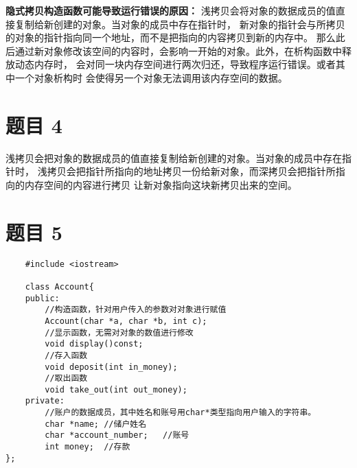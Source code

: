 \documentclass{article}
\begin{document}
\textbf{隐式拷贝构造函数可能导致运行错误的原因：}
浅拷贝会将对象的数据成员的值直接复制给新创建的对象。当对象的成员中存在指针时，
新对象的指针会与所拷贝的对象的指针指向同一个地址，而不是把指向的内容拷贝到新的内存中。
那么此后通过新对象修改该空间的内容时，会影响一开始的对象。此外，在析构函数中释放动态内存时，
会对同一块内存空间进行两次归还，导致程序运行错误。或者其中一个对象析构时
会使得另一个对象无法调用该内存空间的数据。

\section{题目 4}
浅拷贝会把对象的数据成员的值直接复制给新创建的对象。当对象的成员中存在指针时，
浅拷贝会把指针所指向的地址拷贝一份给新对象，而深拷贝会把指针所指向的内存空间的内容进行拷贝
让新对象指向这块新拷贝出来的空间。

\section{题目 5}
\begin{lstlisting}
    #include <iostream>

    class Account{
    public:
        //构造函数，针对用户传入的参数对对象进行赋值
        Account(char *a, char *b, int c);   
        //显示函数，无需对对象的数值进行修改
        void display()const;    
        //存入函数
        void deposit(int in_money);    
        //取出函数
        void take_out(int out_money);   
    private:
        //账户的数据成员，其中姓名和账号用char*类型指向用户输入的字符串。
        char *name; //储户姓名
        char *account_number;   //账号
        int money;  //存款
};
\end{lstlisting}
\end{document}
